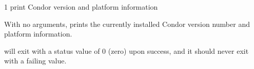 \begin{ManPage}{\label{man-condor-version}}{1}
{print Condor version and platform information}
\Synopsis {}


\Description

With no arguments,  prints the
currently installed Condor version number and platform information.

\ExitStatus

 will exit with a status value of 0 (zero) upon success,
and it should never exit with a failing value.

\end{ManPage}
